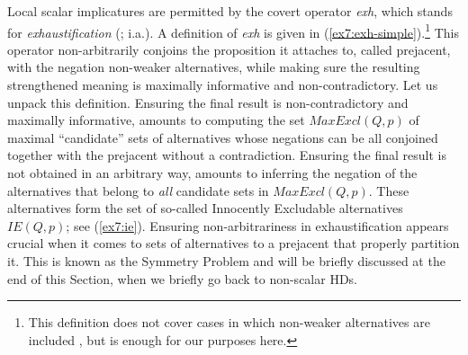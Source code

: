 Local scalar implicatures are permitted by the covert operator \textit{exh}, which stands for \textit{exhaustification} (; i.a.). A definition of \textit{exh} is given in (\ref{ex7:exh-simple}).\footnote{This definition does not cover cases in which non-weaker alternatives are included \citep{BarLev2017}, but is enough for our purposes here.} This operator non-arbitrarily conjoins the proposition it attaches to, called prejacent, with the negation non-weaker alternatives, while making sure the resulting strengthened meaning is maximally informative and non-contradictory. Let us unpack this definition. Ensuring the final result is non-contradictory and maximally informative, amounts to computing the set $MaxExcl(Q, p)$ of maximal ``candidate'' sets of alternatives whose negations can be all conjoined together with the prejacent without a contradiction. Ensuring the final result is not obtained in an arbitrary way, amounts to inferring the negation of the alternatives that belong to \textit{all} candidate sets in $MaxExcl(Q, p)$. These alternatives form the set of so-called Innocently Excludable alternatives $IE(Q, p)$; see (\ref{ex7:ie}). Ensuring non-arbitrariness in exhaustification appears crucial when it comes to sets of alternatives to a prejacent that properly partition it. This is known as the Symmetry Problem \citep{Kroch1972,Fox2007} and will be briefly discussed at the end of this Section, when we briefly go back to non-scalar HDs. 


\begin{exe}
	\label{ex7:exh-simple}
	\label{ex7:ie}
\end{exe}

